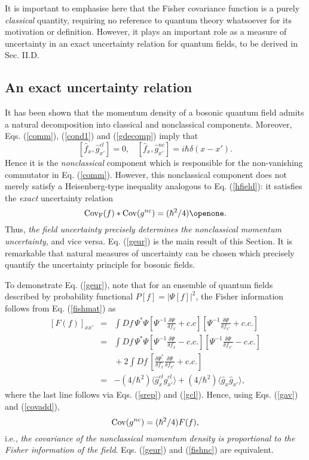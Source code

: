 \documentclass[a4paper,preprint, showpacs, aps, draft]{revtex4}
\begin{document}
{It is important to emphasise here that the Fisher
covariance function is a purely {\it classical} quantity, requiring no
reference to quantum theory whatsoever for its motivation or definition.  
However, it plays an important role as a measure of uncertainty
in an exact uncertainty relation for quantum fields, to be
derived in Sec. II.D.

\subsection{An exact uncertainty relation}

It has been shown that the momentum density of a bosonic quantum field
admits a natural decomposition into classical and nonclassical
components.  Moreover, Eqs. (\ref{comm}), (\ref{cond1}) and
(\ref{gdecomp}) imply that 
\[
[\hat{f}_x, \hat{g}^{cl}_{x'}] = 0,~~~~[\hat{f}_x,\hat{g}^{nc}_{x'}] =
i\hbar\delta(x-x') .\]
Hence it is the {\it nonclassical} component which is responsible for
the non-vanishing commutator in Eq. (\ref{comm}).  However, this
nonclassical component does not merely satisfy a Heisenberg-type inequality
analogous to Eq. (\ref{hfield}):  
it satisfies the {\it exact} uncertainty relation
\begin{equation} \label{geur}
{\rm Cov_F}(f) \ast {\rm Cov}(g^{nc}) = (\hbar^2/4) \openone .
\end{equation}
Thus, {\it the field uncertainty precisely determines the nonclassical
momentum uncertainty}, and vice versa.  Eq. (\ref{geur}) 
is the main result of this
Section.  It is remarkable that natural measures of uncertainty 
can be chosen which
precisely quantify the uncertainty principle for bosonic fields.

To demonstrate Eq. (\ref{geur}), note that for an ensemble of quantum
fields described by probability functional $P[f] = |\Psi[f]|^2$, the
Fisher information  follows from Eq. (\ref{fishmat}) as
\begin{eqnarray*}
\left[ F(f)\right]_{xx'} & = & 
\int D\! f\, \Psi^*\Psi\left[\Psi^{-1}\frac{\delta\Psi}{
\delta f_x} + c.c\right]\left[\Psi^{-1}\frac{\delta\Psi}{\delta f_{x'}} +
c.c.\right]\\
& = & \int D\! f \,\Psi^*\Psi\left[\Psi^{-1}\frac{\delta\Psi}{\delta f_x} -
c.c.\right]\left[\Psi^{-1}\frac{\delta\Psi}{\delta f_{x'}} -
c.c.\right]\\
&   & \mbox{} + 2\int D\! f\,\left[\frac{\delta\Psi^*}{\delta f_x}
\frac{\delta\Psi}{\delta f_{x'}} + c.c.\right]\\
& = & -(4/\hbar^2)\langle\hat{g}^{cl}_x\hat{g}^{cl}_{x'}\rangle +
(4/\hbar^2)\langle \hat{g}_x\hat{g}_{x'}\rangle,
\end{eqnarray*}
where the last line follows via Eqs. (\ref{srep}) and (\ref{gcl}).  Hence,
using Eqs. (\ref{gav}) and (\ref{covadd}),
\begin{equation} \label{fishnc}
{\rm Cov}(g^{nc}) = (\hbar^2/4) F(f) , 
\end{equation}
i.e., {\it the covariance of the nonclassical momentum density is proportional
to the Fisher information of the field}.  Eqs. (\ref{geur}) and
(\ref{fishnc}) are equivalent. 

}
\end{document}
